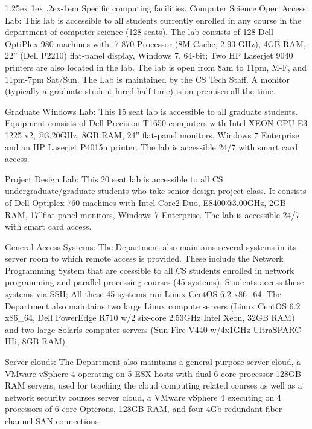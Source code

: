 \documentclass[10pt,letterpaper]{article}
\makeatletter
\renewcommand{\paragraph}{%
  \@startsection{paragraph}{4}%
  {\z@}{1.25ex \@plus 1ex \@minus .2ex}{-1em}%
  {\normalfont\normalsize\bfseries}%
}
\makeatother
\begin{document}
\paragraph{Specific computing facilities.} Computer Science Open Access Lab: This lab is accessible to all students currently enrolled in any course in the department of computer science (128 seats). The lab consists of 128 Dell OptiPlex 980 machines with i7-870 Processor (8M Cache, 2.93 GHz), 4GB RAM, 22'' (Dell P2210) flat-panel display, Windows 7, 64-bit; Two HP Laserjet 9040 printers are also located in the lab. The lab is open from 8am to 11pm, M-F, and 11pm-7pm Sat/Sun. The Lab is maintained by the CS Tech Staff. A monitor (typically a graduate student hired half-time) is on premises all the time.

Graduate Windows Lab: This 15 seat lab is accessible to all graduate students.  Equipment consists of Dell Precision T1650 computers with Intel XEON CPU E3 1225 v2, @3.20GHz, 8GB RAM, 24'' flat-panel monitors, Windows 7 Enterprise and an HP Laserjet P4015n printer. The lab is accessible 24/7 with smart card access.

Project Design Lab: This 20 seat lab is accessible to all CS undergraduate/graduate students who take senior design project class. It consists of  Dell Optiplex 760 machines with Intel Core2 Duo, E8400@3.00GHz, 2GB RAM, 17''flat-panel monitors, Windows 7 Enterprise. The lab is accessible 24/7 with smart card access.

General Access Systems: The Department also maintains several systems in its server room to which remote access is provided. These include the Network Programming System that are ccessible to all CS students enrolled in network programming and parallel processing courses (45 systems); Students access these systems via SSH; All these 45 systems run Linux CentOS 6.2 x86\_64. The Department also maintains two large Linux compute servers (Linux CentOS 6.2 x86\_64, Dell PowerEdge R710 w/2 six-core 2.53GHz Intel Xeon, 32GB RAM) and two large Solaris computer servers (Sun Fire V440 w/4x1GHz UltraSPARC-IIIi, 8GB RAM). 

Server clouds: The Department also maintains a general purpose server cloud, a VMware vSphere 4 operating on 5 ESX hosts with dual 6-core processor 128GB RAM servers, used for teaching the cloud computing related courses as well as a network security courses server cloud,  a VMware vSphere 4 executing on 4 processors of 6-core Opterons, 128GB RAM, and four 4Gb redundant fiber channel SAN connections.
\end{document}
